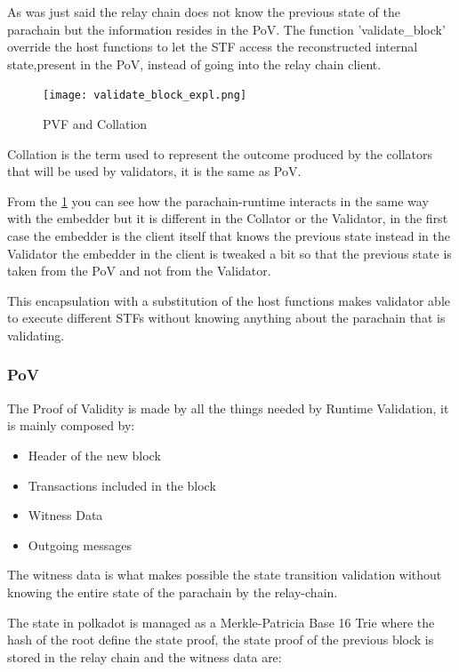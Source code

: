 \documentclass[../main.tex]{subfiles}
\begin{document}
As was just said the relay chain does not know the previous state of the parachain but the information resides in the PoV. The function 'validate\_block' override the host functions to let the STF access the reconstructed internal state,present in the PoV, instead of going into the relay chain client.

\begin{figure}[h]
  \centering
  \texttt{[image: validate\_block\_expl.png]}
  \caption{PVF and Collation}
  \label{fig:pvf_pov}
\end{figure}

Collation is the term used to represent the outcome produced by the collators that will be used by validators, it is the same as PoV.


From the \ref{fig:pvf_pov} you can see how the parachain-runtime interacts in the same way with the embedder but it is different in the Collator or the Validator, in the first case the embedder is the client itself that knows the previous state instead in the Validator the embedder in the client is tweaked a bit so that the previous state is taken from the PoV and not from the Validator.

This encapsulation with a substitution of the host functions makes  validator able to execute different STFs without knowing anything about the parachain that is validating.

\subsubsection{PoV}

The Proof of Validity is made by all the things needed by Runtime Validation, it is mainly composed by:~\cite{cumulus-docs}

\begin{itemize}
  \item Header of the new block
  \item Transactions included in the block
  \item Witness Data
  \item Outgoing messages
\end{itemize}

The witness data is what makes possible the state transition validation without knowing the entire state of the parachain by the relay-chain.

The state in polkadot is managed as a Merkle-Patricia Base 16 Trie where the hash of the root define the state proof, the state proof of the previous block is stored in the relay chain and the witness data are:
\end{document}
